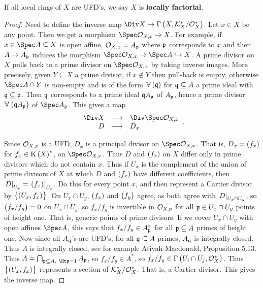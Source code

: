 \begin{definition*}
If all local rings of $ X $ are UFD's, we say $ X $ is \textbf{locally factorial}.
\end{definition*}


\begin{proof}
Need to define the inverse map $ \Div X \to \Gamma\br{X, \KKK_X^* / \OOO_X^*} $. Let $ x \in X $ be any point. Then we get a morphism $ \Spec \OOO_{X, x} \to X $. For example, if $ x \in \Spec A \subseteq X $ is open affine, $ \mathcal{O}_{X, x} = A_{\mathfrak{p}} $ where $ \mathfrak{p} $ corresponds to $ x $ and then $ A \to A_{\mathfrak{p}} $ induces the morphism $ \Spec \OOO_{X, x} \to \Spec A \hookrightarrow X $. A prime divisor on $ X $ pulls back to a prime divisor on $ \Spec \OOO_{X, x} $ by taking inverse images. More precisely, given $ Y \subseteq X $ a prime divisor, if $ x \notin Y $ then pull-back is empty, otherwise $ \Spec A \cap Y $ is non-empty and is of the form $ \VV\br{\qqq} $ for $ \mathfrak{q} \subseteq A $ a prime ideal with $ \mathfrak{q} \subseteq \mathfrak{p} $. Then $ \mathfrak{q} $ corresponds to a prime ideal $ \mathfrak{q} A_{\mathfrak{p}} $ of $ A_{\mathfrak{p}} $, hence a prime divisor $ \VV\br{\qqq A_\ppp} $ of $ \Spec A_\ppp $. This gives a map
$$ \function{\Div X}{\Div \Spec \OOO_{X, x}}{D}{D_x}. $$

\pagebreak

Since $ \mathcal{O}_{X, x} $ is a UFD, $ D_x $ is a principal divisor on $ \Spec \OOO_{X, x} $. That is, $ D_x = \br{f_x} $ for $ f_x \in \K\br{X}^* $, on $ \Spec \OOO_{X, x} $. Thus $ D $ and $ \br{f_x} $ on $ X $ differ only in prime divisors which do not contain $ x $. Thus if $ U_x $ is the complement of the union of prime divisors of $ X $ at which $ D $ and $ \br{f_x} $ have different coefficients, then $ \eval{D}_{U_x} = \eval{\br{f_x}}_{U_x} $. Do this for every point $ x $, and then represent a Cartier divisor by $ \cbr{\br{U_x, f_x}} $. On $ U_x \cap U_y $, $ \br{f_x} $ and $ \br{f_y} $ agree, as both agree with $ \left. D \right|_{U_x \cap U_y} $, so $ \br{f_x / f_y} = 0 $ on $ U_x \cap U_y $, so $ f_x / f_y $ is invertible in $ \mathcal{O}_{X, \mathfrak{p}} $ for all $ \mathfrak{p} \in U_x \cap U_y $ points of height one. That is, generic points of prime divisors. If we cover $ U_x \cap U_y $ with open affines $ \Spec A $, this says that $ f_x / f_y \in A_{\mathfrak{p}}^* $ for all $ \mathfrak{p} \subseteq A $ primes of height one. Now since all $ A_{\mathfrak{q}} $'s are UFD's, for all $ \mathfrak{q} \subseteq A $ primes, $ A_{\mathfrak{q}} $ is integrally closed. Thus $ A $ is integrally closed, see for example Atiyah-Macdonald, Proposition 5.13. Thus $ A = \bigcap_{\ppp \subseteq A, \ \Ht \ppp = 1} A_\ppp $, so $ f_x / f_y \in A^* $, so $ f_x / f_y \in \Gamma\br{U_i \cap U_j, \OOO_X^*} $. Thus $ \cbr{\br{U_x, f_x}} $ represents a section of $ \mathcal{K}_X^* / \mathcal{O}_X^* $. That is, a Cartier divisor. This gives the inverse map.
\end{proof}

